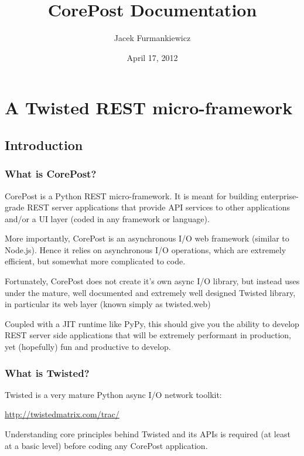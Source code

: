 \documentclass[letterpaper,10pt,english]{sphinxmanual}
\title{CorePost Documentation}
\date{April 17, 2012}
\author{Jacek Furmankiewicz}
\begin{document}
\maketitle
\tableofcontents
{}\label{index::doc}



\chapter{A Twisted REST micro-framework}
\label{index:a-twisted-rest-micro-framework}\label{index:corepost}

\section{Introduction}
\label{intro:introduction}\label{intro::doc}

\subsection{What is CorePost?}
\label{intro:what-is-corepost}
CorePost is a Python REST micro-framework. It is meant for building enterprise-grade REST server applications that provide
API services to other applications and/or a UI layer (coded in any framework or language).

More importantly, CorePost is an asynchronous I/O web framework (similar to Node.js).
Hence it relies on asynchronous I/O operations, which are extremely efficient, but somewhat more complicated to code.

Fortunately, CorePost does not create it's own async I/O library, but instead uses under the mature, well documented
and extremely well designed Twisted library, in particular its web layer (known simply as twisted.web)

Coupled with a JIT runtime like PyPy, this should give you the ability to develop REST server side applications
that will be extremely performant in production, yet (hopefully) fun and productive to develop.


\subsection{What is Twisted?}
\label{intro:what-is-twisted}
Twisted is a very mature Python async I/O network toolkit:

\href{http://twistedmatrix.com/trac/}{http://twistedmatrix.com/trac/}

Understanding core principles behind Twisted and its APIs is required (at least at a basic level) before coding any CorePost application.
\end{document}
